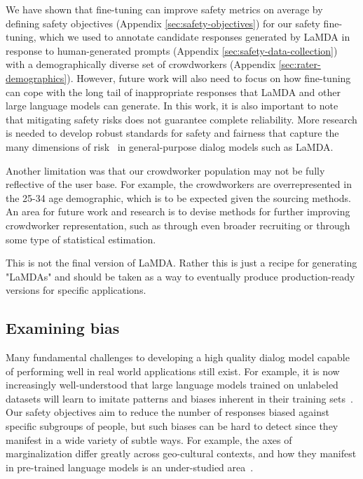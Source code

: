 We have shown that fine-tuning can improve safety metrics on average by defining safety objectives (Appendix \ref{sec:safety-objectives}) for our safety fine-tuning, which we used to annotate candidate responses generated by LaMDA in response to human-generated prompts (Appendix \ref{sec:safety-data-collection}) with a demographically diverse set of crowdworkers (Appendix \ref{sec:rater-demographics}). However, future work will also need to focus on how fine-tuning can cope with the long tail of inappropriate responses that LaMDA and other large language models can generate. In this work, it is also important to note that mitigating safety risks does not guarantee complete reliability. More research is needed to develop robust standards for safety and fairness that capture the many dimensions of risk~\cite{weidinger2021ethical} in general-purpose dialog models such as LaMDA. \

Another limitation was that our crowdworker population may not be fully reflective of the user base. For example, the crowdworkers are  overrepresented in the 25-34 age demographic, which is to be expected given the sourcing methods. An area for future work and research is to devise methods for further improving crowdworker representation, such as through  even broader recruiting or through some type of statistical estimation.

This is not the final version of LaMDA. Rather this is just a recipe for generating "LaMDAs" and should be taken as a way to eventually produce production-ready versions for specific applications.

\subsection{Examining bias} Many fundamental challenges to developing a high quality dialog model capable of performing well in real world applications still exist. For example, it is now increasingly well-understood that large language models trained on unlabeled datasets will learn to imitate patterns and biases inherent in their training sets~\cite{tan2019assessing}. Our safety objectives aim to reduce the number of responses biased against specific subgroups of people, but such biases can be hard to detect since they manifest in a wide variety of subtle ways. For example, the axes of marginalization differ greatly across geo-cultural contexts, and how they manifest in pre-trained language models is an under-studied area~\cite{sambasivan2021reimagining}.


